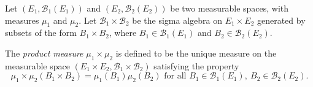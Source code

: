 \documentclass{article}
\begin{document}
Let $(E_1, \mathcal{B}_1(E_1))$ and $(E_2, \mathcal{B}_2(E_2))$ be two measurable spaces, with measures $\mu_1$ and $\mu_2$. Let $\mathcal{B}_1 \times \mathcal{B}_2$ be the sigma algebra on $E_1 \times E_2$ generated by subsets of the form $B_1 \times B_2$, where $B_1 \in \mathcal{B}_1(E_1)$ and $B_2 \in \mathcal{B}_2(E_2)$.

The {\em product measure} $\mu_1 \times \mu_2$ is defined to be the unique measure on the measurable space $(E_1 \times E_2, \mathcal{B}_1 \times \mathcal{B}_2)$ satisfying the property
$$
\mu_1 \times \mu_2(B_1 \times B_2) = \mu_1(B_1) \mu_2(B_2) \text{\ for all\ } B_1 \in \mathcal{B}_1(E_1),\ B_2 \in \mathcal{B}_2(E_2).
$$
\end{document}
